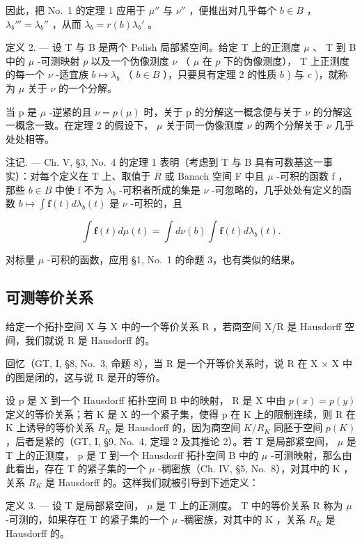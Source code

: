 因此，把 No.~1 的定理 1 应用于 \(\mu''\) 与 \(\nu''\) ，便推出对几乎每个 \(b \in B\) ， \(\lambda_b''' = \lambda_b''\) ，从而 \(\lambda_b = r(b)\lambda_b'\) 。

定义 2. --- 设 T 与 B 是两个 Polish 局部紧空间。给定 T 上的正测度 \(\mu\) 、 T 到 B 中的 \(\mu\) -可测映射 \(p\) 以及一个伪像测度 \(\nu\) （ \(\mu\) 在 \(p\) 下的伪像测度）， T 上正测度的每一个 \(\nu\) -适宜族 \(b \mapsto \lambda_b\) （ \(b \in B\) ），只要具有定理 2 的性质 \(b\) ) 与 \(c\) )，就称为 \(\mu\) 关于 \(\nu\) 的一个分解。

当 p 是 \(\mu\) -逆紧的且 \(\nu = p(\mu)\) 时，关于 p 的分解这一概念便与关于 \(\nu\) 的分解这一概念一致。在定理 2 的假设下， \(\mu\) 关于同一伪像测度 \(\nu\) 的两个分解关于 \(\nu\) 几乎处处相等。

注记. --- Ch. V, §3, No.~4 的定理 1 表明（考虑到 T 与 B 具有可数基这一事实）：对每个定义在 T 上、取值于 \(\overline{R}\) 或 Banach 空间 F 中且 \(\mu\) -可积的函数 f ，那些 \(b \in B\) 中使 f 不为 \(\lambda_{b}\) -可积者所成的集是 \(\nu\) -可忽略的，几乎处处有定义的函数 \(b \mapsto \int \mathbf{f}(t) d\lambda_{b}(t)\) 是 \(\nu\) -可积的，且

\[
\int \mathbf {f} (t) d \mu (t) = \int d \nu (b) \int \mathbf {f} (t) d \lambda_ {b} (t).
\]

对标量 \(\mu\) -可积的函数，应用 §1, No.~1 的命题 3，也有类似的结果。

\subsection{可测等价关系}

给定一个拓扑空间 X 与 X 中的一个等价关系 R ，若商空间 X/R 是 Hausdorff 空间，我们就说 R 是 Hausdorff 的。

回忆（GT, I, §8, No.~3, 命题 8），当 R 是一个开等价关系时，说 R 在 X × X 中的图是闭的，这与说 R 是开的等价。

设 p 是 X 到一个 Hausdorff 拓扑空间 B 中的映射， R 是 X 中由 \(p(x) = p(y)\) 定义的等价关系；若 K 是 X 的一个紧子集，使得 p 在 K 上的限制连续，则 R 在 K 上诱导的等价关系 \(R_{K}\) 是 Hausdorff 的，因为商空间 \(K/R_{K}\) 同胚于空间 \(p(K)\) ，后者是紧的（GT, I, §9, No.~4, 定理 2 及其推论 2）。若 T 是局部紧空间， \(\mu\) 是 T 上的正测度， p 是 T 到一个 Hausdorff 拓扑空间 B 中的 \(\mu\) -可测映射，那么由此看出，存在 T 的紧子集的一个 \(\mu\) -稠密族（Ch. IV, §5, No.~8），对其中的 K ，关系 \(R_{K}\) 是 Hausdorff 的。这样我们就被引导到下述定义：

定义 3. --- 设 T 是局部紧空间， \(\mu\) 是 T 上的正测度。 T 中的等价关系 R 称为 \(\mu\) -可测的，如果存在 T 的紧子集的一个 \(\mu\) -稠密族，对其中的 K ，关系 \(R_{K}\) 是 Hausdorff 的。

